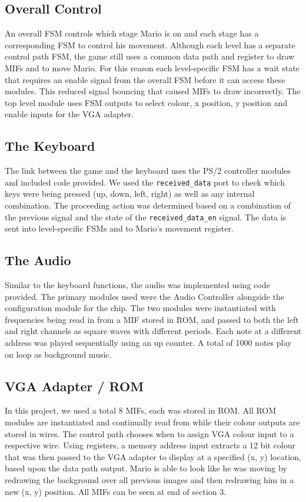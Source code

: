 \documentclass[12pt]{article}
\begin{document}
\subsection{Overall Control}
An overall FSM controls which stage Mario is on and each stage has a corresponding FSM to control his movement. Although each level has a separate control path FSM, the game still uses a common data path and register to draw MIFs and to move Mario. For this reason each level-specific FSM has a wait state that requires an enable signal from the overall FSM before it can access these modules. This reduced signal bouncing that caused MIFs to draw incorrectly. The top level module uses FSM outputs to select colour, x position, y position and enable inputs for the VGA adapter. 
\subsection{The Keyboard}
The link between the game and the keyboard uses the PS/2 controller modules and included code provided. We used the \texttt{received\_data} port to check which keys were being pressed (up, down, left, right) as well as any internal combination. The proceeding action was determined based on a combination of the previous signal and the state of the \texttt{received\_data\_en} signal. The data is sent into level-specific FSMs and to Mario's movement register. 
\subsection{The Audio}
Similar to the keyboard functions, the audio was implemented using code provided. The primary modules used were the Audio Controller alongside the configuration module for the chip. The two modules were instantiated with frequencies being read in from a MIF stored in ROM, and passed to both the left and right channels as square waves with different periods. Each note at a different address was played sequentially using an up counter. A total of 1000 notes play on loop as background music. 
\subsection{VGA Adapter / ROM}
In this project, we used a total 8 MIFs, each was stored in ROM. All ROM modules are instantiated and continually read from while their colour outputs are stored in wires. The control path chooses when to assign VGA colour input to a respective wire. Using registers, a memory address input extracts a 12 bit colour that was then passed to the VGA adapter to display at a specified (x, y) location, based upon the data path output. Mario is able to look like he was moving by redrawing the background over all previous images and then redrawing him in a new (x, y) position. All MIFs can be seen at end of section 3.  
\end{document}
